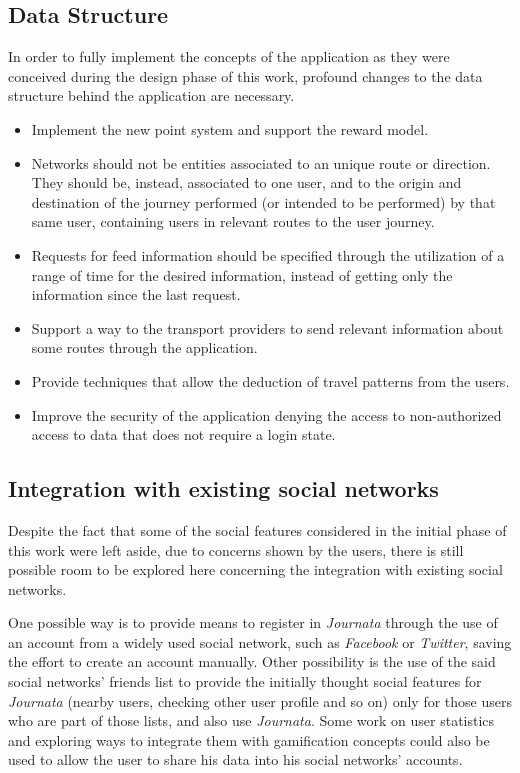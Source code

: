 \subsection{Data Structure}

In order to fully implement the concepts of the application as they were conceived during the design phase of this work, profound changes to the data structure behind the application are necessary. 

\begin{itemize}
\item Implement the new point system and support the reward model.
\item Networks should not be entities associated to an unique route or direction. They should be, instead, associated to one user, and to the origin and destination of the journey performed (or intended to be performed) by that same user, containing users in relevant routes to the user journey.
\item Requests for feed information should be specified through the utilization of a range of time for the desired information, instead of getting only the information since the last request.
\item Support a way to the transport providers to send relevant information about some routes through the application.
\item Provide techniques that allow the deduction of travel patterns from the users.
\item Improve the security of the application denying the access to non-authorized access to data that does not require a login state. 
\end{itemize}

\subsection{Integration with existing social networks}

Despite the fact that some of the social features considered in the initial phase of this work were left aside, due to concerns shown by the users, there is still possible room to be explored here concerning the integration with existing social networks. 

One possible way is to provide means to register in \emph{Journata} through the use of an account from a widely used social network, such as \emph{Facebook} or \emph{Twitter}, saving the effort to create an account manually.
Other possibility is the use of the said social networks' friends list to provide the initially thought social features for \emph{Journata} (nearby users, checking other user profile and so on) only for those users who are part of those lists, and also use \emph{Journata}.
Some work on user statistics and exploring ways to integrate them with gamification concepts could also be used to allow the user to share his data into his social networks' accounts.



